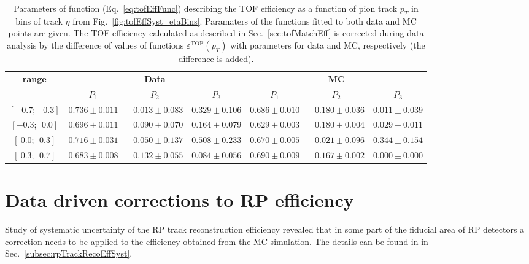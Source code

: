 \begin{table}[t!]%
\centering%
\begin{tabular}{c||r|r|r||r|r|r}%
\multirow{2}{*}{\textbf{\bm{$\eta$} range}} &  \multicolumn{3}{c||}{\textbf{Data}} & \multicolumn{3}{c}{\textbf{MC}} \\ \cline{2-7}
  & \multicolumn{1}{c|}{$P_{1}$} & \multicolumn{1}{c|}{$P_{2}$} & \multicolumn{1}{c||}{$P_{3}$} & \multicolumn{1}{c|}{$P_{1}$} & \multicolumn{1}{c|}{$P_{2}$} & \multicolumn{1}{c}{$P_{3}$} \\ \Xhline{2\arrayrulewidth}
$[-0.7; -0.3]$   &\small  $ 0.736 \pm 0.011 $  &\small  $ 0.013 \pm 0.083 $  &\small  $ 0.329 \pm 0.106 $  &\small  $ 0.686 \pm 0.010 $  &\small  $ 0.180 \pm 0.036 $  &\small  $ 0.011 \pm 0.039 $\\
$[-0.3; ~~0.0]$   &\small  $ 0.696 \pm 0.011 $  &\small  $ 0.090 \pm 0.070 $  &\small  $ 0.164 \pm 0.079 $  &\small  $ 0.629 \pm 0.003 $  &\small  $ 0.180 \pm 0.004 $  &\small  $ 0.029 \pm 0.011 $\\
$[~0.0; ~~0.3]$   &\small  $ 0.716 \pm 0.031 $  &\small  $ -0.050 \pm 0.137 $  &\small  $ 0.508 \pm 0.233 $  &\small  $ 0.670 \pm 0.005 $  &\small  $ -0.021 \pm 0.096 $  &\small  $ 0.344 \pm 0.154 $\\
$[~0.3;~~ 0.7]$   &\small  $ 0.683 \pm 0.008 $  &\small  $ 0.132 \pm 0.055 $  &\small  $ 0.084 \pm 0.056 $  &\small  $ 0.690 \pm 0.009 $  &\small  $ 0.167 \pm 0.002 $  &\small  $ 0.000 \pm 0.000 $\\
\end{tabular}%
\caption[Parameters of function describing the TOF efficiency as a function of pion track $p_{T}$ in bins of track $\eta$.]{Parameters of function (Eq.~\eqref{eq:tofEffFunc}) describing the TOF efficiency as a function of pion track $p_{T}$ in bins of track $\eta$ from Fig.~\ref{fig:tofEffSyst_etaBins}. Paramaters of the functions fitted to both data and MC points are given. The TOF efficiency calculated as described in Sec.~\ref{sec:tofMatchEff} is corrected during data analysis by the difference of values of functions $\varepsilon^{\text{TOF}}(p_{T})$ with parameters for data and MC, respectively (the difference is added).}\label{tab:tofEffCorrParams}
\end{table}






\section{Data driven corrections to RP efficiency}\label{sec:rpTrackEffCorr}

Study of systematic uncertainty of the RP track reconstruction efficiency revealed that in some part of the fiducial area of RP detectors a correction needs to be applied to the efficiency obtained from the MC simulation.  The details can be found in in Sec.~\ref{subsec:rpTrackRecoEffSyst}. 
